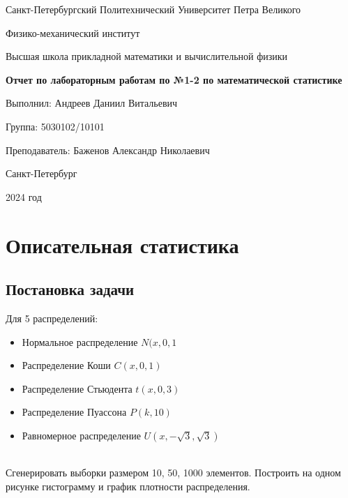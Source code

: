 \documentclass[14pt]{extarticle}
\begin{document}
\pagestyle{empty}
\begin{center}
    Санкт-Петербургский Политехнический Университет Петра Великого

    \vspace{0.3cm}

    Физико-механический институт

    \vspace{0.3cm}

    Высшая школа прикладной математики и вычислительной физики

    \vspace{3cm}

    {\large\textbf{Отчет по лабораторным работам по №1-2 по математической статистике}}

    \vspace{4.5cm}

    Выполнил: \hspace{5.5cm}Андреев Даниил Витальевич

    Группа: \hspace{9.5cm}5030102/10101

    Преподаватель: \hspace{3.6cm}Баженов Александр Николаевич

    \vspace{4cm}

    Санкт-Петербург

    2024 год
\end{center}

\newpage

\section{Описательная статистика}
\subsection{Постановка задачи}
Для 5 распределений:

\begin{itemize}
    \item Нормальное распределение \(N(x, 0, 1\)
    \item Распределение Коши \(C(x, 0, 1)\)
    \item Распределение Стьюдента \(t(x, 0, 3)\)
    \item Распределение Пуассона \(P(k, 10)\)
    \item Равномерное распределение \(U(x,-\sqrt{3}, \sqrt{3})\)
\end{itemize}\\
Сгенерировать выборки размером 10, 50, 1000 элементов. Построить на одном рисунке гистограмму и график плотности распределения.
\end{document}
